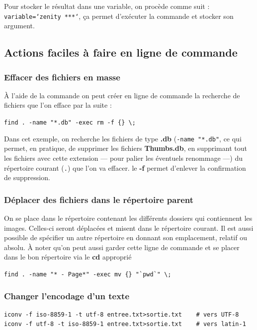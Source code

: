 \documentclass[a4paper,twoside]{article}
\begin{document}
\begin{remarque}
Pour stocker le résultat dans une variable, on procède comme suit : \texttt{variable=`zenity ***`}, ça permet d'exécuter la commande et stocker son argument.
\end{remarque}

\subsection{Actions faciles à faire en ligne de commande}
\subsubsection{Effacer des fichiers en masse}
À l'aide de la commande  on peut créer en ligne de commande la recherche de fichiers que l'on efface par la suite :

\verb|find . -name "*.db" -exec rm -f {} \;|


Dans cet exemple, on recherche les fichiers de type \textbf{.db} (\verb|-name "*.db"|, ce qui permet, en pratique, de supprimer les fichiers \textbf{Thumbs.db}, en supprimant tout les fichiers avec cette extension --- pour palier les éventuels renommage ---) du répertoire courant (\verb|.|) que l'on va effacer. le \textbf{-f} permet d'enlever la confirmation de suppression. \par

\subsubsection{Déplacer des fichiers dans le répertoire parent}
On se place dans le répertoire contenant les différents dossiers qui contiennent les images. Celles-ci seront déplacées et misent dans le répertoire courant. Il est aussi possible de spécifier un autre répertoire en donnant son emplacement, relatif ou absolu. À noter qu'on peut aussi garder cette ligne de commande et se placer dans le bon répertoire via le \textbf{cd} approprié

\verb|find . -name "* - Page*" -exec mv {} "`pwd`" \;|

\subsubsection{Changer l'encodage d'un texte}
\begin{verbatim}
iconv -f iso-8859-1 -t utf-8 entree.txt>sortie.txt    # vers UTF-8
iconv -f utf-8 -t iso-8859-1 entree.txt>sortie.txt    # vers latin-1
\end{verbatim}
\end{document}
